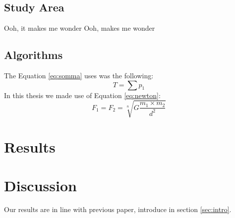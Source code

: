 \documentclass[12 pt]{article} %
\begin{document}
\subsection{Study Area}
Ooh, it makes me wonder
Ooh, makes me wonder
\subsection{Algorithms}
The Equation \ref{eq:somma} uses was the following:
\begin{equation}
    T = \sum p_1\label{eq:somma}
\end{equation}
In this thesis we made use of Equation \ref{eq:newton}:
\begin{equation}
    F_1=F_2= \sqrt[n]{G\frac{m_1 \times m_2}{d^2}}%
    \label{eq:newton} %
\end{equation}

\section{Results}
\section{Discussion}
Our results are in line with previous paper, introduce in section \ref{sec:intro}.
\end{document}
